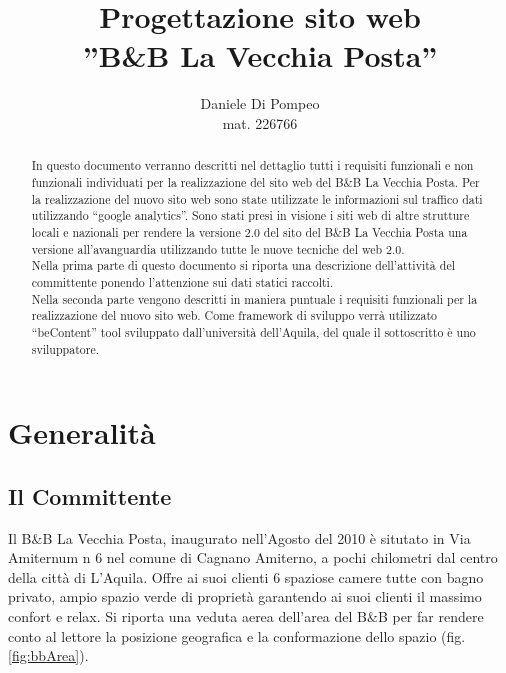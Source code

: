 \documentclass[a4paper,12pt,hidelinks]{report}
\title{Progettazione sito web\\ ''B\&B La Vecchia Posta''}
\author{Daniele Di Pompeo \\mat. 226766}
\begin{document}

\maketitle

\begin{abstract}
In questo documento verranno descritti nel dettaglio tutti i requisiti funzionali e non funzionali individuati per la realizzazione del sito web del B\&B La Vecchia Posta.
Per la realizzazione del nuovo sito web sono state utilizzate le informazioni sul traffico dati utilizzando ``google analytics''. Sono stati presi in visione i siti web di altre strutture
locali e nazionali per rendere la versione 2.0 del sito del B\&B La Vecchia Posta una versione all'avanguardia utilizzando tutte le nuove tecniche del web 2.0.
\\
Nella prima parte di questo documento si riporta una descrizione dell'attività del committente ponendo l'attenzione sui dati statici raccolti.
\\
Nella seconda parte vengono descritti in maniera puntuale i requisiti funzionali per la realizzazione del nuovo sito web. Come framework di sviluppo verrà utilizzato ``beContent'' tool 
sviluppato dall'università dell'Aquila, del quale il sottoscritto è uno sviluppatore.
\end{abstract}

\chapter{Generalità}

\section{Il Committente}
Il B\&B La Vecchia Posta, inaugurato nell'Agosto del 2010 è situtato in Via Amiternum n 6 nel comune di Cagnano Amiterno, a pochi chilometri dal centro della città di L'Aquila.
Offre ai suoi clienti 6 spaziose camere tutte con bagno privato, ampio spazio verde di proprietà garantendo ai suoi clienti il massimo confort e relax. 
Si riporta una veduta aerea dell'area del B\&B per far rendere conto al lettore la posizione geografica e la conformazione dello spazio (fig.\ref{fig:bbArea}). 
\end{document}
